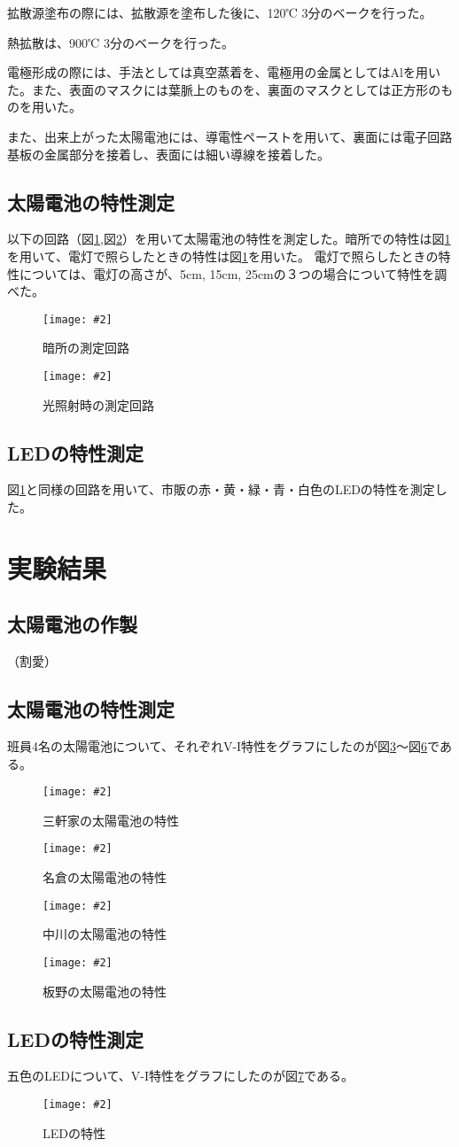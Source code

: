 \documentclass[11pt]{ltjsarticle}
\newcommand{\fig}[3]{
	\begin{figure}
		\texttt{[image: \#2]}
		\caption{#3}
		\label{#1}
	\end{figure}
}
\newcommand{\fr}[1]{図\ref{#1}}
\begin{document}
		拡散源塗布の際には、拡散源を塗布した後に、120℃ 3分のベークを行った。
		
		熱拡散は、900℃ 3分のベークを行った。
		
		電極形成の際には、手法としては真空蒸着を、電極用の金属としてはAlを用いた。また、表面のマスクには葉脈上のものを、裏面のマスクとしては正方形のものを用いた。

		また、出来上がった太陽電池には、導電性ペーストを用いて、裏面には電子回路基板の金属部分を接着し、表面には細い導線を接着した。

	\subsection{太陽電池の特性測定}
		以下の回路（\fr{fig2},\fr{fig3}）を用いて太陽電池の特性を測定した。暗所での特性は\fr{fig2}を用いて、電灯で照らしたときの特性は\fr{fig2}を用いた。
		電灯で照らしたときの特性については、電灯の高さが、5cm, 15cm, 25cmの３つの場合について特性を調べた。
		\fig{fig2}{resources/circuit/dark.png}{暗所の測定回路}
		\fig{fig3}{resources/circuit/light.png}{光照射時の測定回路}

	\subsection{LEDの特性測定}
		\fr{fig2}と同様の回路を用いて、市販の赤・黄・緑・青・白色のLEDの特性を測定した。

\section{実験結果}
	\subsection{太陽電池の作製}
		（割愛）
	\subsection{太陽電池の特性測定}
		\label{sec1}
		班員4名の太陽電池について、それぞれV-I特性をグラフにしたのが\fr{fig4}〜\fr{fig7}である。
		\fig{fig4}{resources/solar/base/sangenya.png}{三軒家の太陽電池の特性}
		\fig{fig5}{resources/solar/base/nagura.png}{名倉の太陽電池の特性}
		\fig{fig6}{resources/solar/base/nakagawa.png}{中川の太陽電池の特性}
		\fig{fig7}{resources/solar/base/itano.png}{板野の太陽電池の特性}

	\subsection{LEDの特性測定}
		五色のLEDについて、V-I特性をグラフにしたのが\fr{fig8}である。
		\fig{fig8}{resources/led/led.png}{LEDの特性}
\end{document}
